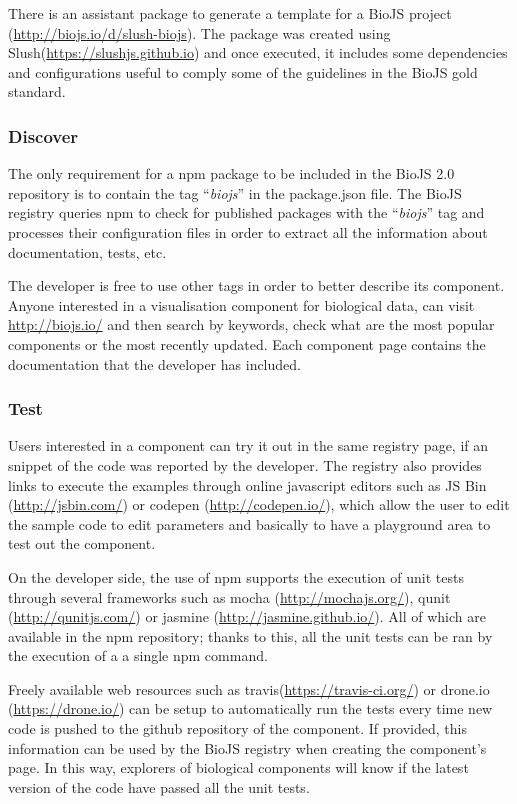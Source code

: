 There is an assistant package to generate a template for a BioJS project (\url{http://biojs.io/d/slush-biojs}). The package was created using Slush(\url{https://slushjs.github.io}) and once executed, it includes some dependencies and configurations useful to comply some of the guidelines in the BioJS gold standard.

\subsubsection{Discover}
The only requirement for a npm package to be included in the BioJS 2.0 repository is to contain the tag ``\emph{biojs}'' in the package.json file. The BioJS registry queries npm to check for published packages with the ``\emph{biojs}'' tag and processes their configuration files in order to extract all the information about documentation, tests, etc.%

The developer is free to use other tags in order to better describe its component. Anyone interested in a visualisation component for biological data, can visit \url{http://biojs.io/} and then search by keywords, check what are the most popular components or the most recently updated. Each component page contains the documentation that the developer has included.

\subsubsection{Test}
Users interested in a component can try it out in the same registry page, if an snippet of the code was reported by the developer. The registry also provides links to execute the examples through online javascript editors such as JS Bin (\url{http://jsbin.com/}) or codepen (\url{http://codepen.io/}), which allow the user to edit the sample code to edit parameters and basically to have a playground area to test out the component.

On the developer side, the use of npm supports the execution of unit tests through several frameworks such as mocha (\url{http://mochajs.org/}), qunit (\url{http://qunitjs.com/}) or jasmine (\url{http://jasmine.github.io/}). All of which are available in the npm repository; thanks to this, all the unit tests can be ran by the execution of a a single npm command. 

Freely available web resources such as travis(\url{https://travis-ci.org/}) or drone.io (\url{https://drone.io/}) can be setup to automatically run the tests every time new code is pushed to the github repository of the component. If provided, this information can be used by the BioJS registry when creating the component's page. In this way, explorers of biological components will know if the latest version of the code have passed all the unit tests.


